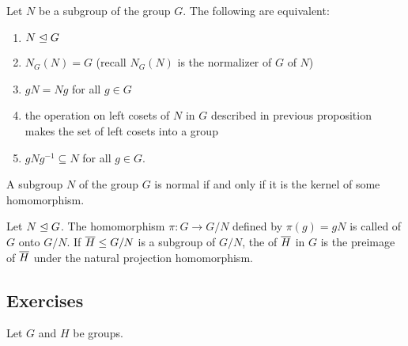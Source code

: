 \documentclass[10pt,a4paper]{report}
\begin{document}
\begin{theorem}
Let $N$ be a subgroup of the group $G$.  The following are equivalent:
\begin{enumerate}
	\item $N \trianglelefteq G$
	\item $N_G(N)=G$ (recall $N_G(N)$ is the normalizer of $G$ of $N$)
	\item $gN=Ng$ for all $g \in G$
	\item the operation on left cosets of $N$ in $G$ described in previous proposition makes the set of left cosets into a group
	\item $gNg^{-1} \subseteq N$ for all $g \in G$.
\end{enumerate}
\end{theorem}

\begin{prop}A subgroup $N$ of the group $G$ is normal if and only if it is the kernel of some homomorphism.
\end{prop}

\begin{definition}Let $N \trianglelefteq G$.  The homomorphism $\pi: G \to G/N$ defined by $\pi(g)=gN$ is called  of $G$ onto $G/N$.  If $\overline{H} \le G/N$ is a subgroup of $G/N$, the  of $\overline{H}$ in $G$ is the preimage of $\overline{H}$ under the natural projection homomorphism.
\end{definition}

\subsection{Exercises}

Let $G$ and $H$ be groups.
\end{document}
